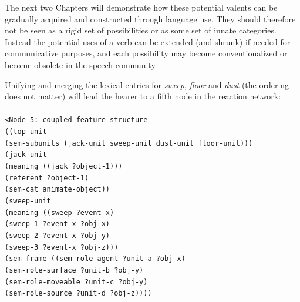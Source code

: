 The next two Chapters will demonstrate how these potential valents can be gradually acquired and constructed through language use. They should therefore not be seen as a rigid set of possibilities or as some set of innate categories. Instead the potential uses of a verb can be extended (and shrunk) if needed for communicative purposes, and each possibility may become conventionalized or become obsolete in the speech community.

Unifying and merging the lexical entries for {\em sweep}, {\em floor} and {\em dust} (the ordering does not matter) will lead the hearer to a fifth node in the reaction network:
\\
\\
{\footnotesize{\tt <Node-5: coupled-feature-structure
\\ ((top-unit
\\ \hspace*{5mm} (sem-subunits (jack-unit sweep-unit dust-unit floor-unit)))
\\ \hspace*{2mm}(jack-unit
\\ \hspace*{5mm} (meaning ((jack ?object-1)))
\\ \hspace*{5mm} (referent ?object-1)
\\ \hspace*{5mm} (sem-cat animate-object))
\\ \hspace*{2mm}(sweep-unit
\\ \hspace*{5mm} (meaning ((sweep ?event-x)
\\ \hspace*{27mm}(sweep-1 ?event-x ?obj-x)
\\ \hspace*{27mm}(sweep-2 ?event-x ?obj-y)
\\ \hspace*{27mm}(sweep-3 ?event-x ?obj-z)))
\\ \hspace*{5mm} (sem-frame ((sem-role-agent ?unit-a ?obj-x)
\\ \hspace*{30mm}(sem-role-surface ?unit-b ?obj-y)
\\ \hspace*{30mm}(sem-role-moveable ?unit-c ?obj-y)
\\ \hspace*{30mm}(sem-role-source ?unit-d ?obj-z))))
}}
